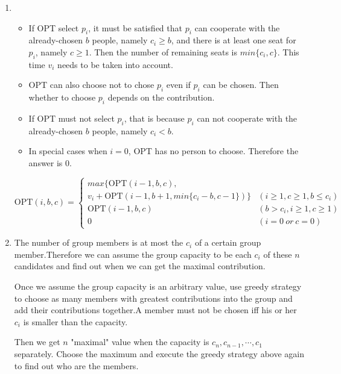 \documentclass[12pt,a4paper]{article}
\theoremstyle{definition}
\begin{document}
\begin{enumerate}
    	\begin{enumerate}
    	\item 
    	    \begin{itemize}
    	    	\item
    	    	    If OPT select $p_i$, it must be satisfied that $p_i$ can cooperate with the already-chosen $b$ people, namely $c_i\ge b$, and there is at least one seat for $p_i$, namely $c\ge 1$. Then the number of remaining seats is $min\{c_i,c\}$. This time $v_i$ needs to be taken into account.
    	    	\item 
    	    	    OPT can also choose not to chose $p_i$ even if $p_i$ can be chosen. Then whether to choose $p_i$ depends on the contribution.
    	    	\item 
    	    	    If OPT must not select $p_i$, that is because $p_i$ can not cooperate with the already-chosen $b$ people, namely $c_i<b$.
    	    	\item 
    	    	    In special cases when $i=0$, OPT has no person to choose. Therefore the answer is $0$.
    	    \end{itemize}
        
    	    \begin{equation*}
    	        \text{OPT}(i, b, c)=
    	        \begin{cases}
    	            max\{\text{OPT}(i-1,b,c),\\v_i+\text{OPT}(i-1,b+1,min\{c_i-b,c-1\})\}&(i\ge 1,c\ge 1,b\le c_i)\\
    	            \text{OPT}(i-1, b, c)&(b>c_i,i\ge 1,c\ge 1)\\
    	            0&(i=0\ or\ c=0)
    	        \end{cases}
    	    \end{equation*}
    	    
    	\item 
    	    The number of group members is at most the $c_i$ of a certain group member.Therefore we can assume the group capacity to be each $c_i$ of these $n$ candidates and find out when we can get the maximal contribution.
    	    
    	    Once we assume the group capacity is an arbitrary value, use greedy strategy to choose as many members with greatest contributions into the group and add their contributions together.A member must not be chosen iff his or her $c_i$ is smaller than the capacity.
    	    
    	    Then we get $n$ "maximal" value when the capacity is $c_n,c_{n-1},\cdots,c_1$ separately. Choose the maximum and execute the greedy strategy above again to find out who are the members. 
    	    

\end{enumerate}
\end{enumerate}
\end{document}
